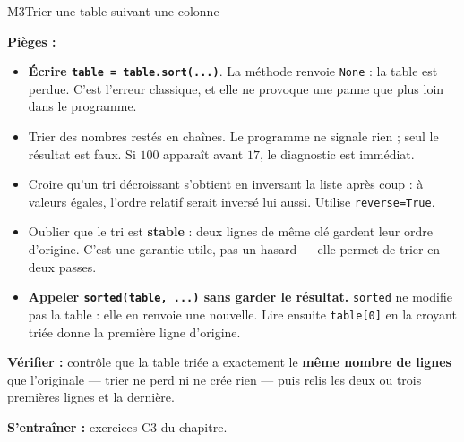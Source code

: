 \begin{fichemethode}{M3}{Trier une table suivant une colonne}

\textbf{Pièges :}
\begin{itemize}
  \item \textbf{Écrire \lstinline{table = table.sort(...)}}. La méthode renvoie
    \lstinline{None} : la table est perdue. C'est l'erreur classique, et elle ne provoque
    une panne que plus loin dans le programme.
  \item Trier des nombres restés en chaînes. Le programme ne signale rien ; seul le
    résultat est faux. Si $100$ apparaît avant $17$, le diagnostic est immédiat.
  \item Croire qu'un tri décroissant s'obtient en inversant la liste après coup : à valeurs
    égales, l'ordre relatif serait inversé lui aussi. Utilise \lstinline{reverse=True}.
  \item Oublier que le tri est \textbf{stable} : deux lignes de même clé gardent leur ordre
    d'origine. C'est une garantie utile, pas un hasard — elle permet de trier en deux passes.
  \item \textbf{Appeler \lstinline{sorted(table, ...)} sans garder le résultat.}
    \lstinline{sorted} ne modifie pas la table : elle en renvoie une nouvelle. Lire ensuite
    \lstinline{table[0]} en la croyant triée donne la première ligne d'origine.
\end{itemize}

\textbf{Vérifier :} contrôle que la table triée a exactement le \textbf{même nombre de
lignes} que l'originale — trier ne perd ni ne crée rien — puis relis les deux ou trois
premières lignes et la dernière.

\textbf{S'entraîner :} exercices C3 du chapitre.
\end{fichemethode}
